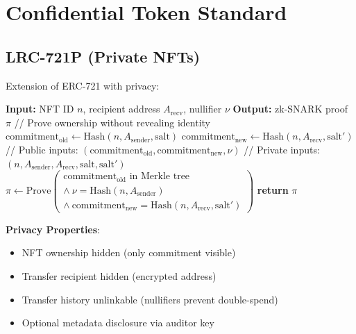 \section{Confidential Token Standard}


\subsection{LRC-721P (Private NFTs)}

Extension of ERC-721 with privacy:

\begin{algorithm}[H]
\caption{Shielded NFT Transfer}
\begin{algorithmic}[1]
\State \textbf{Input:} NFT ID $n$, recipient address $A_{\text{recv}}$, nullifier $\nu$
\State \textbf{Output:} zk-SNARK proof $\pi$
\State
\State // Prove ownership without revealing identity
\State $\text{commitment}_{\text{old}} \leftarrow \text{Hash}(n, A_{\text{sender}}, \text{salt})$
\State $\text{commitment}_{\text{new}} \leftarrow \text{Hash}(n, A_{\text{recv}}, \text{salt}')$
\State
\State // Public inputs: $(\text{commitment}_{\text{old}}, \text{commitment}_{\text{new}}, \nu)$
\State // Private inputs: $(n, A_{\text{sender}}, A_{\text{recv}}, \text{salt}, \text{salt}')$
\State
\State $\pi \leftarrow \text{Prove}\left(\begin{array}{l}
  \text{commitment}_{\text{old}} \text{ in Merkle tree} \\
  \land \ \nu = \text{Hash}(n, A_{\text{sender}}) \\
  \land \ \text{commitment}_{\text{new}} = \text{Hash}(n, A_{\text{recv}}, \text{salt}')
\end{array}\right)$
\State \textbf{return} $\pi$
\end{algorithmic}
\end{algorithm}

\textbf{Privacy Properties}:
\begin{itemize}[leftmargin=1.1em]
  \item NFT ownership hidden (only commitment visible)
  \item Transfer recipient hidden (encrypted address)
  \item Transfer history unlinkable (nullifiers prevent double-spend)
  \item Optional metadata disclosure via auditor key
\end{itemize}

